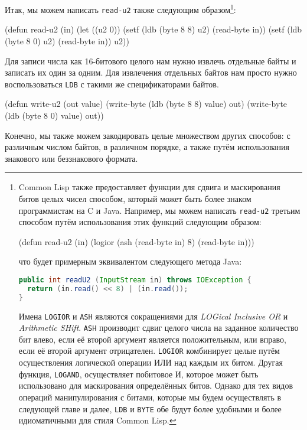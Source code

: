 Итак, мы можем написать \lstinline{read-u2} также следующим образом\footnote{Common Lisp также предоставляет функции для сдвига и маскирования битов целых чисел способом, который может быть более знаком программистам на C и Java. Например, мы можем написать \lstinline{read-u2} третьим способом путём использования этих функций следующим образом:

\begin{myverb}
(defun read-u2 (in)
  (logior (ash (read-byte in) 8) (read-byte in)))
\end{myverb}

\noindent{}что будет примерным эквивалентом следующего метода Java:

\begin{lstlisting}[language=Java]
public int readU2 (InputStream in) throws IOException {
  return (in.read() << 8) | (in.read());
}
\end{lstlisting}

Имена \lstinline{LOGIOR} и \lstinline{ASH} являются сокращениями для \textit{LOGical Inclusive
  OR} и \textit{Arithmetic SHift}. \lstinline{ASH} производит сдвиг целого числа на заданное
количество бит влево, если её второй аргумент является положительным, или вправо, если её
второй аргумент отрицателен. \lstinline{LOGIOR} комбинирует целые путём осуществления
логической операции ИЛИ над каждым их битом. Другая функция, \lstinline{LOGAND}, осуществляет
побитовое И, которое может быть использовано для маскирования определённых битов. Однако
для тех видов операций манипулирования с битами, которые мы будем осуществлять в следующей
главе и далее, \lstinline{LDB} и \lstinline{BYTE} обе будут более удобными и более идиоматичными
для стиля Common Lisp.}:

\begin{myverb}
(defun read-u2 (in)
  (let ((u2 0))
    (setf (ldb (byte 8 8) u2) (read-byte in))
    (setf (ldb (byte 8 0) u2) (read-byte in))
    u2))
\end{myverb}

Для записи числа как 16-битового целого нам нужно извлечь отдельные байты и записать их
один за одним. Для извлечения отдельных байтов нам просто нужно воспользоваться
\lstinline{LDB} с такими же спецификаторами байтов.

\begin{myverb}
(defun write-u2 (out value)
  (write-byte (ldb (byte 8 8) value) out)
  (write-byte (ldb (byte 8 0) value) out))
\end{myverb}

Конечно, мы также можем закодировать целые множеством других способов: с различным числом
байтов, в различном порядке, а также путём использования знакового или беззнакового
формата.

